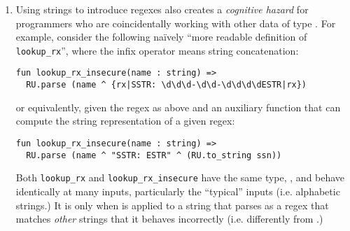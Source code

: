 \begin{enumerate}
\begin{figure}[h]
\begin{lstlisting}[numbers=none]
  fun lookup_rx(name : string) => 
    R.Seq(R.Str name, R.Seq(R.Str "SSTR: ESTR", ssn))
\end{lstlisting}
\caption{Compositional construction of a regex.}
\label{fig:lookup_rx}
\end{figure}


We will describe derived forms that do capture the idioms of compositional regex construction in Sec. \ref{sec:syntax-dialects} (in particular, we will compare Figure \ref{fig:lookup_rx} to \ref{fig:derived-spliced-subexpressions}.)

Dynamic string parsing cannot capture the idioms of list construction for the same reason -- list expressions can  contain sub-expressions.


\item Using strings to introduce regexes also creates a \emph{cognitive hazard} for programmers who are coincidentally working with other data of type . For example, consider the following na\"ively ``more readable definition of \lstinline{lookup_rx}'', where the infix operator \li{^} means string concatenation:
\begin{lstlisting}[numbers=none,escapechar=~]
fun lookup_rx_insecure(name : string) => 
  RU.parse (name ^ {rx|SSTR: \d\d\d-\d\d-\d\d\d\dESTR|rx})
\end{lstlisting}

or equivalently, given the regex  as above and an auxiliary function  that can compute the string representation of a given regex:
\begin{lstlisting}[numbers=none,escapechar=~]
fun lookup_rx_insecure(name : string) => 
  RU.parse (name ^ "SSTR: ESTR" ^ (RU.to_string ssn))
\end{lstlisting}

Both \lstinline{lookup_rx} and \lstinline{lookup_rx_insecure} have the same type, , and behave identically at many inputs, particularly the ``typical'' inputs (i.e. alphabetic strings.) It is only when  is applied to a string that parses as a regex that matches \emph{other} strings that it behaves incorrectly (i.e. differently from .)


\end{enumerate}
